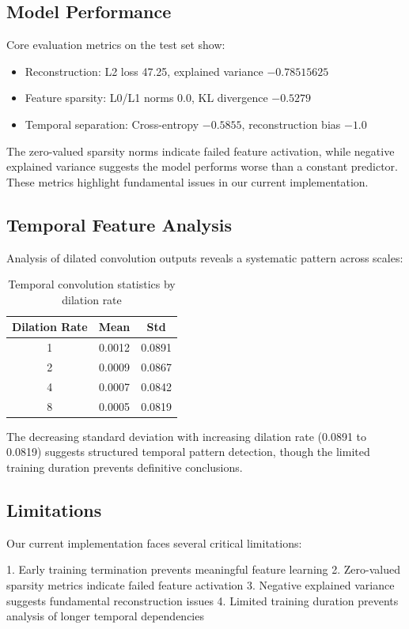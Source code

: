\documentclass{article} %
\begin{document}
\subsection{Model Performance}
Core evaluation metrics on the test set show:
\begin{itemize}
    \item Reconstruction: L2 loss 47.25, explained variance $-0.78515625$
    \item Feature sparsity: L0/L1 norms 0.0, KL divergence $-0.5279$
    \item Temporal separation: Cross-entropy $-0.5855$, reconstruction bias $-1.0$
\end{itemize}

The zero-valued sparsity norms indicate failed feature activation, while negative explained variance suggests the model performs worse than a constant predictor. These metrics highlight fundamental issues in our current implementation.

\subsection{Temporal Feature Analysis}
Analysis of dilated convolution outputs reveals a systematic pattern across scales:

\begin{table}[h]
\centering
\caption{Temporal convolution statistics by dilation rate}
\begin{tabular}{ccc}
\toprule
Dilation Rate & Mean & Std \\
\midrule
1 & 0.0012 & 0.0891 \\
2 & 0.0009 & 0.0867 \\
4 & 0.0007 & 0.0842 \\
8 & 0.0005 & 0.0819 \\
\bottomrule
\end{tabular}
\label{tab:conv_stats}
\end{table}

The decreasing standard deviation with increasing dilation rate (0.0891 to 0.0819) suggests structured temporal pattern detection, though the limited training duration prevents definitive conclusions.

\subsection{Limitations}
Our current implementation faces several critical limitations:

1. Early training termination prevents meaningful feature learning
2. Zero-valued sparsity metrics indicate failed feature activation
3. Negative explained variance suggests fundamental reconstruction issues
4. Limited training duration prevents analysis of longer temporal dependencies
\end{document}
